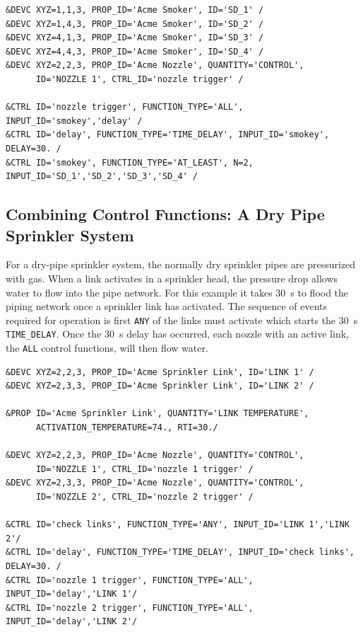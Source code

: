 \documentclass[11pt]{book}
\newcommand{\ct}{\tt\small}
\begin{document}
\footnotesize
\begin{verbatim}
&DEVC XYZ=1,1,3, PROP_ID='Acme Smoker', ID='SD_1' /
&DEVC XYZ=1,4,3, PROP_ID='Acme Smoker', ID='SD_2' /
&DEVC XYZ=4,1,3, PROP_ID='Acme Smoker', ID='SD_3' /
&DEVC XYZ=4,4,3, PROP_ID='Acme Smoker', ID='SD_4' /
&DEVC XYZ=2,2,3, PROP_ID='Acme Nozzle', QUANTITY='CONTROL',
      ID='NOZZLE 1', CTRL_ID='nozzle trigger' /

&CTRL ID='nozzle trigger', FUNCTION_TYPE='ALL', INPUT_ID='smokey','delay' /
&CTRL ID='delay', FUNCTION_TYPE='TIME_DELAY', INPUT_ID='smokey', DELAY=30. /
&CTRL ID='smokey', FUNCTION_TYPE='AT_LEAST', N=2, INPUT_ID='SD_1','SD_2','SD_3','SD_4' /
\end{verbatim}
\normalsize

\subsection{Combining Control Functions: A Dry Pipe Sprinkler System}

For a dry-pipe sprinkler system, the normally
dry sprinkler pipes are pressurized with gas.  When a link activates in a sprinkler head, the pressure drop allows
water to flow into the pipe network.  For this example it takes 30~s to flood the piping network once a sprinkler link
has activated.  The sequence of events required for operation is first {\ct ANY} of the links must activate which
starts the 30~s {\ct TIME\_DELAY}.  Once the 30~s delay has occurred, each nozzle with an active link, the {\ct ALL}
control functions, will then flow water.

\footnotesize
\begin{verbatim}
&DEVC XYZ=2,2,3, PROP_ID='Acme Sprinkler Link', ID='LINK 1' /
&DEVC XYZ=2,3,3, PROP_ID='Acme Sprinkler Link', ID='LINK 2' /

&PROP ID='Acme Sprinkler Link', QUANTITY='LINK TEMPERATURE',
      ACTIVATION_TEMPERATURE=74., RTI=30./

&DEVC XYZ=2,2,3, PROP_ID='Acme Nozzle', QUANTITY='CONTROL',
      ID='NOZZLE 1', CTRL_ID='nozzle 1 trigger' /
&DEVC XYZ=2,3,3, PROP_ID='Acme Nozzle', QUANTITY='CONTROL',
      ID='NOZZLE 2', CTRL_ID='nozzle 2 trigger' /

&CTRL ID='check links', FUNCTION_TYPE='ANY', INPUT_ID='LINK 1','LINK 2'/
&CTRL ID='delay', FUNCTION_TYPE='TIME_DELAY', INPUT_ID='check links', DELAY=30. /
&CTRL ID='nozzle 1 trigger', FUNCTION_TYPE='ALL', INPUT_ID='delay','LINK 1'/
&CTRL ID='nozzle 2 trigger', FUNCTION_TYPE='ALL', INPUT_ID='delay','LINK 2'/
\end{verbatim}
\normalsize
\end{document}
